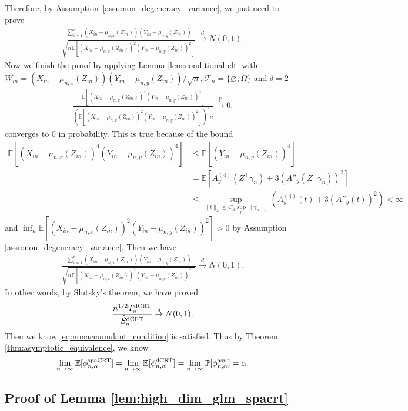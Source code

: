 \documentclass[12pt]{article}
\theoremstyle{definition}
\def\P{\mathbb{P}}
\def\P{\mathbb{P}}
\newcommand{\E}{\mathbb E}								%
\renewcommand{\P}{\mathbb{P}}							%
\newcommand{\convp}{\overset{\mathbb{P}}{\rightarrow}}             %
\newcommand{\convd}{\overset d \rightarrow}             %
\newcommand{\srx}{X}									%
\newcommand{\srz}{Z}									%
\newcommand{\sry}{Y}									%
\newcommand{\dCRT}{\textnormal{dCRT}} 					%
\newcommand{\spacrt}{\textnormal{spaCRT}}               %
\newcommand{\asy}{\textnormal{asy}}              %
\begin{document}
Therefore, by Assumption~\ref{assu:non_degeneracy_variance}, we just need to prove 
\begin{align*}
	\frac{\sum_{i=1}^n(\srx_{in}-\mu_{n,x}(\srz_{in}))(\sry_{in}-\mu_{n,y}(\srz_{in}))}{\sqrt{n\E[(\srx_{in}-\mu_{n,x}(\srz_{in}))^2(\sry_{in}-\mu_{n,y}(\srz_{in}))^2]}}\convd N(0,1).
\end{align*}
Now we finish the proof by applying Lemma \ref{lem:conditional-clt} with $W_{in}=(\srx_{in}-\mu_{n,x}(\srz_{in}))(\sry_{in}-\mu_{n,y}(\srz_{in}))/\sqrt{n},\mathcal{F}_n=\{\varnothing,\Omega\}$ and $\delta=2$
\begin{align*}
  \frac{\E[(\srx_{in}-\mu_{n,x}(\srz_{in}))^4(\sry_{in}-\mu_{n,y}(\srz_{in}))^4]}{(\E[(\srx_{in}-\mu_{n,x}(\srz_{in}))^2(\sry_{in}-\mu_{n,y}(\srz_{in}))^2])^{2}n} \convp 0.
\end{align*}
converges to $0$ in probability. This is true because of the bound 
\begin{align*}
  \E[(\srx_{in}-\mu_{n,x}(\srz_{in}))^4(\sry_{in}-\mu_{n,y}(\srz_{in}))^4]
  &
  \leq \E[(\sry_{in}-\mu_{n,y}(\srz_{in}))^4]\\
  &
  =\E[A^{(4)}_y(\srz^\top \gamma_n)+3(A''_y(\srz^\top \gamma_n))^2]\\
  &
  \leq \sup_{\|t\|_2\leq C_Z\sup_n\|\gamma_n\|_1}(A_y^{(4)}(t)+3(A''_y(t))^2)<\infty
\end{align*}
and $\inf_n\E[(\srx_{in}-\mu_{n,x}(\srz_{in}))^2(\sry_{in}-\mu_{n,y}(\srz_{in}))^2]>0$ by Assumption \ref{assu:non_degeneracy_variance}. Then we have 
\begin{align*}
  \frac{\sum_{i=1}^n(\srx_{in}-\mu_{n,x}(\srz_{in}))(\sry_{in}-\mu_{n,y}(\srz_{in}))}{\sqrt{n\E[(\srx_{in}-\mu_{n,x}(\srz_{in}))^2(\sry_{in}-\mu_{n,y}(\srz_{in}))^2]}}\convd N(0,1).
\end{align*}
In other words, by Slutsky's theorem, we have proved
\begin{align*}
  \frac{n^{1/2}T_n^{\dCRT}}{\widehat{S}_n^{\dCRT}}\convd N(0,1).
\end{align*}
Then we know \eqref{eq:nonaccumulant_condition} is satisfied. Thus by Theorem \ref{thm:asymptotic_equivalence}, we know 
\begin{align*}
  \lim_{n\rightarrow\infty}\E[\phi_{n,\alpha}^{\spacrt}]=\lim_{n\rightarrow\infty}\E[\phi_{n,\alpha}^{\dCRT}]=\lim_{n\rightarrow\infty}\P[\phi_{n,\alpha}^{\asy}]=\alpha.
\end{align*}


\subsection{Proof of Lemma \ref{lem:high_dim_glm_spacrt}}\label{sec:proof_high_dim_spacrt_equivalence}
\end{document}
